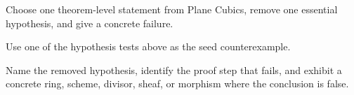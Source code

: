 \begin{exercise}\label{exr:vi43-expand-16}
Choose one theorem-level statement from Plane Cubics, remove one essential hypothesis, and give a concrete failure.
\end{exercise}
\begin{hint}
Use one of the hypothesis tests above as the seed counterexample.
\end{hint}
\begin{solution}
Name the removed hypothesis, identify the proof step that fails, and exhibit a concrete ring, scheme, divisor, sheaf, or morphism where the conclusion is false.
\end{solution}

